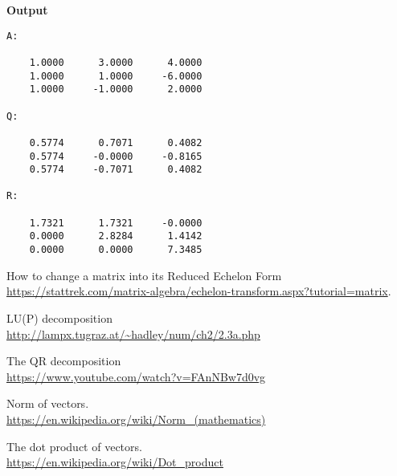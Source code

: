 \hsep
{\bf Output}
\begin{verbatim}
A:

    1.0000      3.0000      4.0000  
    1.0000      1.0000     -6.0000  
    1.0000     -1.0000      2.0000  

Q:

    0.5774      0.7071      0.4082  
    0.5774     -0.0000     -0.8165  
    0.5774     -0.7071      0.4082  

R:

    1.7321      1.7321     -0.0000  
    0.0000      2.8284      1.4142  
    0.0000      0.0000      7.3485 
\end{verbatim}


\begin{thebibliography}{9}
How to change a matrix into its Reduced Echelon Form
\\ 
\url{https://stattrek.com/matrix-algebra/echelon-transform.aspx?tutorial=matrix}.

LU(P) decomposition
\\ 
\url{http://lampx.tugraz.at/~hadley/num/ch2/2.3a.php}

The QR decomposition
\\ 
\url{https://www.youtube.com/watch?v=FAnNBw7d0vg}

Norm of vectors.
\\ 
\url{https://en.wikipedia.org/wiki/Norm_(mathematics)}

The dot product of vectors.
\\ 
\url{https://en.wikipedia.org/wiki/Dot_product}
\end{thebibliography}
